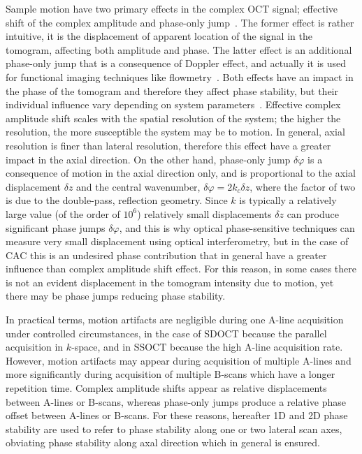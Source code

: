 Sample motion have two primary effects in the complex OCT signal; effective shift of the complex amplitude and phase-only jump~\cite{Chen1997_Optical, White2003_vivo, Shemonski2014_Stability}. The former effect is rather intuitive, it is the displacement of apparent location of the signal in the tomogram, affecting both amplitude and phase. The latter effect is an additional phase-only jump that is a consequence of Doppler effect, and actually it is used for functional imaging techniques like flowmetry~\cite{Braaf2019_OCTBased}. Both effects have an impact in the phase of the tomogram and therefore they affect phase stability, but their individual influence vary depending on system parameters~\cite{Shemonski2014_Stability}. Effective complex amplitude shift scales with the spatial resolution of the system; the higher the resolution, the more susceptible the system may be to motion. In general, axial resolution is finer than lateral resolution, therefore this effect have a greater impact in the axial direction. On the other hand, phase-only jump $\delta \varphi$ is a consequence of motion in the axial direction only, and is proportional to the axial displacement $\delta z$ and the central wavenumber, $\delta \varphi = 2k_c\delta z$, where the factor of two is due to the double-pass, reflection geometry. Since $k$ is typically a relatively large value (of the order of $10^6$) relatively small displacements $\delta z$ can produce significant phase jumps $\delta\varphi$, and this is why optical phase-sensitive techniques can measure very small displacement using optical interferometry, but in the case of CAC this is an undesired phase contribution that in general have a greater influence than complex amplitude shift effect. For this reason, in some cases there is not an evident displacement in the tomogram intensity due to motion, yet there may be phase jumps reducing phase stability.

In practical terms, motion artifacts are negligible during one A-line acquisition under controlled circumstances, in the case of SDOCT because the parallel acquisition in $k$-space, and in SSOCT because the high A-line acquisition rate. However, motion artifacts may appear during acquisition of multiple A-lines and more significantly during acquisition of multiple B-scans which have a longer repetition time. Complex amplitude shifts appear as relative displacements between A-lines or B-scans, whereas phase-only jumps produce a relative phase offset between A-lines or B-scans. For these reasons, hereafter 1D and 2D phase stability are used to refer to phase stability along one or two lateral scan axes, obviating phase stability along axal direction which in general is ensured.

